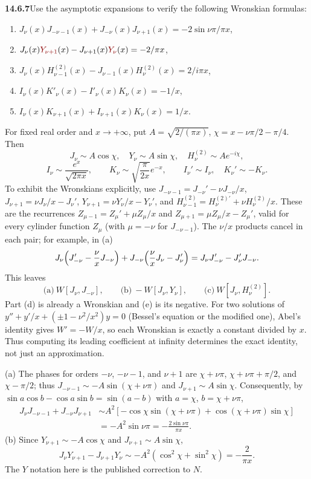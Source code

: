\par\bigskip
\noindent\textbf{14.6.7}\quad Use the asymptotic expansions to verify
the following Wronskian formulas:
\begin{enumerate}
\item[(a)] $J_{\nu}(x)J_{-\nu-1}(x)+J_{-\nu}(x)J_{\nu+1}(x)
=-2\sin\nu\pi/\pi x$,
\item[(b)] $J_{\nu}(x)\erratum{Y_{\nu+1}}(x)
-J_{\nu+1}(x)\erratum{Y_{\nu}}(x)=-2/\pi x$,
\item[(c)] $J_{\nu}(x)H_{\nu-1}^{(2)}(x)-J_{\nu-1}(x)H_{\nu}^{(2)}(x)
=2/i\pi x$,
\item[(d)] $I_{\nu}(x)K'_{\nu}(x)-I'_{\nu}(x)K_{\nu}(x)=-1/x$,
\item[(e)] $I_{\nu}(x)K_{\nu+1}(x)+I_{\nu+1}(x)K_{\nu}(x)=1/x$.
\end{enumerate}
\solution
For fixed real order and $x\to+\infty$, put
$A=\sqrt{2/(\pi x)}$, $\chi=x-\nu\pi/2-\pi/4$. Then
\[
J_\nu\sim A\cos\chi,\quad Y_\nu\sim A\sin\chi,\quad
H_\nu^{(2)}\sim Ae^{-i\chi},
\]
\[
I_\nu\sim\frac{e^x}{\sqrt{2\pi x}},\qquad
K_\nu\sim\sqrt{\frac\pi{2x}}e^{-x},\qquad
I_\nu'\sim I_\nu,\quad K_\nu'\sim-K_\nu.
\]
To exhibit the Wronskians explicitly, use
$J_{-\nu-1}=J_{-\nu}'-\nu J_{-\nu}/x$,
$J_{\nu+1}=\nu J_\nu/x-J_\nu'$,
$Y_{\nu+1}=\nu Y_\nu/x-Y_\nu'$, and
$H_{\nu-1}^{(2)}=H_\nu^{(2)\prime}+\nu H_\nu^{(2)}/x$.
These are the recurrences $Z_{\mu-1}=Z_\mu'+\mu Z_\mu/x$ and
$Z_{\mu+1}=\mu Z_\mu/x-Z_\mu'$, valid for every cylinder function
$Z_\mu$ (with $\mu=-\nu$ for $J_{-\nu-1}$). The $\nu/x$ products
cancel in each pair; for example, in (a)
\[
J_\nu\Bigl(J_{-\nu}'-\frac\nu xJ_{-\nu}\Bigr)
+J_{-\nu}\Bigl(\frac\nu xJ_\nu-J_\nu'\Bigr)
=J_\nu J_{-\nu}'-J_\nu'J_{-\nu}.
\]
This leaves
\[
\text{(a)}\ W[J_\nu,J_{-\nu}],\qquad
\text{(b)}\ -W[J_\nu,Y_\nu],\qquad
\text{(c)}\ W[J_\nu,H_\nu^{(2)}].
\]
Part (d) is already a Wronskian and (e) is its negative.
For two solutions of $y''+y'/x+(\pm1-\nu^2/x^2)y=0$ (Bessel's
equation or the modified one), Abel's identity gives
$W'=-W/x$, so each Wronskian is exactly a constant divided
by $x$. Thus computing its leading coefficient at infinity
determines the exact identity, not just an approximation.

(a) The phases for orders $-\nu$, $-\nu-1$, and $\nu+1$
are $\chi+\nu\pi$, $\chi+\nu\pi+\pi/2$, and
$\chi-\pi/2$; thus $J_{-\nu-1}\sim-A\sin(\chi+\nu\pi)$ and
$J_{\nu+1}\sim A\sin\chi$. Consequently, by
$\sin a\cos b-\cos a\sin b=\sin(a-b)$ with $a=\chi$,
$b=\chi+\nu\pi$,
\begin{align*}
J_\nu J_{-\nu-1}+J_{-\nu}J_{\nu+1}
&\sim A^2[-\cos\chi\sin(\chi+\nu\pi)
+\cos(\chi+\nu\pi)\sin\chi]\\
&=-A^2\sin\nu\pi=\boxed{-\frac{2\sin\nu\pi}{\pi x}}.
\end{align*}
(b) Since $Y_{\nu+1}\sim-A\cos\chi$ and
$J_{\nu+1}\sim A\sin\chi$,
\[
J_\nu Y_{\nu+1}-J_{\nu+1}Y_\nu
\sim-A^2(\cos^2\chi+\sin^2\chi)
=\boxed{-\frac2{\pi x}}.
\]
The $Y$ notation here is the published correction to $N$.

